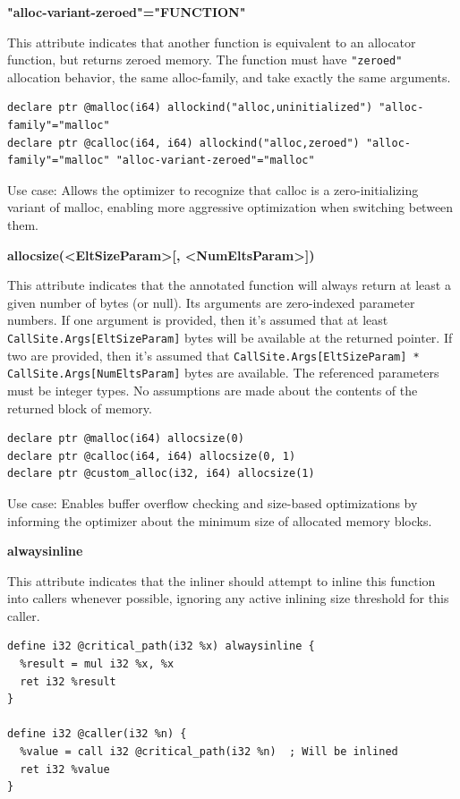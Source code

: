 \textbf{"alloc-variant-zeroed"="FUNCTION"}

This attribute indicates that another function is equivalent to an allocator function, but returns zeroed memory.
The function must have \texttt{"zeroed"} allocation behavior, the same alloc-family, and take exactly the same arguments.

\begin{lstlisting}[style=ir]
declare ptr @malloc(i64) allockind("alloc,uninitialized") "alloc-family"="malloc"
declare ptr @calloc(i64, i64) allockind("alloc,zeroed") "alloc-family"="malloc" "alloc-variant-zeroed"="malloc"
\end{lstlisting}

Use case: Allows the optimizer to recognize that calloc is a zero-initializing variant of malloc, enabling more aggressive optimization when switching between them.

\textbf{allocsize(<EltSizeParam>[, <NumEltsParam>])}

This attribute indicates that the annotated function will always return at least a given number of bytes (or null).
Its arguments are zero-indexed parameter numbers.
If one argument is provided, then it's assumed that at least \texttt{CallSite.Args[EltSizeParam]} bytes will be available at the returned pointer.
If two are provided, then it's assumed that \texttt{CallSite.Args[EltSizeParam] * CallSite.Args[NumEltsParam]} bytes are available.
The referenced parameters must be integer types.
No assumptions are made about the contents of the returned block of memory.

\begin{lstlisting}[style=ir]
declare ptr @malloc(i64) allocsize(0)
declare ptr @calloc(i64, i64) allocsize(0, 1)
declare ptr @custom_alloc(i32, i64) allocsize(1)
\end{lstlisting}

Use case: Enables buffer overflow checking and size-based optimizations by informing the optimizer about the minimum size of allocated memory blocks.

\textbf{alwaysinline}

This attribute indicates that the inliner should attempt to inline this function into callers whenever possible, ignoring any active inlining size threshold for this caller.

\begin{lstlisting}[style=ir]
define i32 @critical_path(i32 %x) alwaysinline {
  %result = mul i32 %x, %x
  ret i32 %result
}

define i32 @caller(i32 %n) {
  %value = call i32 @critical_path(i32 %n)  ; Will be inlined
  ret i32 %value
}
\end{lstlisting}

